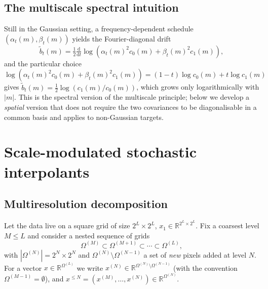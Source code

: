 \documentclass[11pt]{amsart}
\newcommand{\bR}{\mathbb{R}} \newcommand{\bN}{\mathbb{N}}
\newcommand{\rd}{\mathrm{d}}
\theoremstyle{remark}
\numberwithin{equation}{section}
\begin{document}
\subsection{The multiscale spectral intuition}
Still in the Gaussian setting, a frequency-dependent schedule $(\alpha_t(m),\beta_t(m))$ yields the Fourier-diagonal drift
\begin{equation}
 \tilde b_t(m) = \tfrac{1}{2}\tfrac{\rd}{\rd t}\log(\alpha_t(m)^2 c_0(m)+\beta_t(m)^2 c_1(m)),
\end{equation}
and the particular choice
\begin{equation}
 \log(\alpha_t(m)^2 c_0(m)+\beta_t(m)^2 c_1(m)) = (1-t)\log c_0(m) + t\log c_1(m)
\end{equation}
gives $\tilde b_t(m)=\tfrac12\log(c_1(m)/c_0(m))$, which grows only logarithmically with $|m|$. This is the spectral version of the multiscale principle; below we develop a \emph{spatial} version that does not require the two covariances to be diagonalisable in a common basis and applies to non-Gaussian targets.

\section{Scale-modulated stochastic interpolants}
\label{sec:interpolant}
\subsection{Multiresolution decomposition}
Let the data live on a square grid of size $2^L\times 2^L$, $x_1\in\bR^{2^L\times 2^L}$. Fix a coarsest level $M\le L$ and consider a nested sequence of grids
\begin{equation}
 \Omega^{(M)}\subset\Omega^{(M+1)}\subset\cdots\subset\Omega^{(L)},
\end{equation}
with $|\Omega^{(N)}|=2^N\times 2^N$ and $\Omega^{(N)}\setminus\Omega^{(N-1)}$ a set of \emph{new} pixels added at level $N$. For a vector $x\in\bR^{\Omega^{(L)}}$ we write $x^{(N)}\in\bR^{\Omega^{(N)}\setminus\Omega^{(N-1)}}$ (with the convention $\Omega^{(M-1)}=\emptyset$), and $x^{\le N}=(x^{(M)},\ldots,x^{(N)})\in\bR^{\Omega^{(N)}}$.
\end{document}
